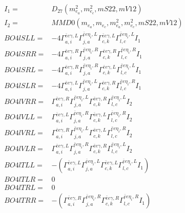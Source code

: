 \documentclass[A4,landscape]{article}
\begin{document}
\begin{align} 
I_1 = & D_{27}(m^2_{e_{{a}}}, m^2_{e_{{c}}}, mS22, mV12) \\ 
I_2 = & MMD0(m_{e_{{a}}}, m_{e_{{c}}}, m^2_{e_{{a}}}, m^2_{e_{{c}}}, mS22, mV12) \\ 
  BO4lSLL= & -4  \Gamma^{\bar{e}e \gamma ,L}_{a, i} \Gamma^{\bar{e}e \eta_i ,L}_{j, a} \Gamma^{\bar{e}e \gamma ,L}_{c, k} \Gamma^{\bar{e}e \eta_i ,L}_{l, c} I_1 \\ 
  BO4lSRR= & -4  \Gamma^{\bar{e}e \gamma ,R}_{a, i} \Gamma^{\bar{e}e \eta_i ,R}_{j, a} \Gamma^{\bar{e}e \gamma ,R}_{c, k} \Gamma^{\bar{e}e \eta_i ,R}_{l, c} I_1 \\ 
  BO4lSRL= & -4  \Gamma^{\bar{e}e \gamma ,R}_{a, i} \Gamma^{\bar{e}e \eta_i ,R}_{j, a} \Gamma^{\bar{e}e \gamma ,L}_{c, k} \Gamma^{\bar{e}e \eta_i ,L}_{l, c} I_1 \\ 
  BO4lSLR= & -4  \Gamma^{\bar{e}e \gamma ,L}_{a, i} \Gamma^{\bar{e}e \eta_i ,L}_{j, a} \Gamma^{\bar{e}e \gamma ,R}_{c, k} \Gamma^{\bar{e}e \eta_i ,R}_{l, c} I_1 \\ 
  BO4lVRR= &  \Gamma^{\bar{e}e \gamma ,R}_{a, i} \Gamma^{\bar{e}e \eta_i ,L}_{j, a} \Gamma^{\bar{e}e \gamma ,R}_{c, k} \Gamma^{\bar{e}e \eta_i ,L}_{l, c} I_2 \\ 
  BO4lVLL= &  \Gamma^{\bar{e}e \gamma ,L}_{a, i} \Gamma^{\bar{e}e \eta_i ,R}_{j, a} \Gamma^{\bar{e}e \gamma ,L}_{c, k} \Gamma^{\bar{e}e \eta_i ,R}_{l, c} I_2 \\ 
  BO4lVRL= &  \Gamma^{\bar{e}e \gamma ,R}_{a, i} \Gamma^{\bar{e}e \eta_i ,L}_{j, a} \Gamma^{\bar{e}e \gamma ,L}_{c, k} \Gamma^{\bar{e}e \eta_i ,R}_{l, c} I_2 \\ 
  BO4lVLR= &  \Gamma^{\bar{e}e \gamma ,L}_{a, i} \Gamma^{\bar{e}e \eta_i ,R}_{j, a} \Gamma^{\bar{e}e \gamma ,R}_{c, k} \Gamma^{\bar{e}e \eta_i ,L}_{l, c} I_2 \\ 
  BO4lTLL= & -( \Gamma^{\bar{e}e \gamma ,L}_{a, i} \Gamma^{\bar{e}e \eta_i ,L}_{j, a} \Gamma^{\bar{e}e \gamma ,L}_{c, k} \Gamma^{\bar{e}e \eta_i ,L}_{l, c} I_1) \\ 
  BO4lTLR= & 0 \\ 
  BO4lTRL= & 0 \\ 
  BO4lTRR= & -( \Gamma^{\bar{e}e \gamma ,R}_{a, i} \Gamma^{\bar{e}e \eta_i ,R}_{j, a} \Gamma^{\bar{e}e \gamma ,R}_{c, k} \Gamma^{\bar{e}e \eta_i ,R}_{l, c} I_1) \\ 
\end{align} 
\end{document}
